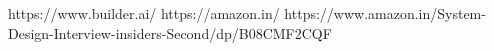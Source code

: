 \documentclass[11pt]{report}
\begin{document}
 

   
%
\begin{thebibliography}{999}

 https://www.builder.ai/
 https://amazon.in/
 https://www.amazon.in/System-Design-Interview-insiders-Second/dp/B08CMF2CQF

\end{thebibliography}
\end{document}
